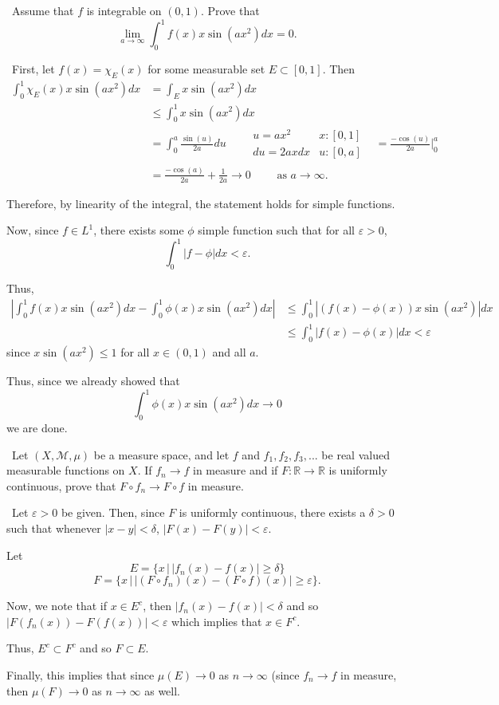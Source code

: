 \documentclass[12pt]{Homework}
\begin{document}
\begin{problem} $\,$
Assume that $f$ is integrable on $(0,1)$. Prove that $$\lim_{a\to\infty}\int_0^1f(x)x\sin(ax^2)dx=0.$$
\end{problem}


\begin{solution}$\,$
First, let $f(x)=\chi_E(x)$ for some measurable set $E\subset[0,1]$. Then \begin{align*}
    \int_0^1\chi_E(x)x\sin(ax^2)dx&=\int_Ex\sin(ax^2)dx\\
    &\le\int_0^1x\sin(ax^2)dx\\
    &=\int_0^a\frac{\sin(u)}{2a}du\qquad \begin{matrix}
    u=ax^2 &  x:[0,1]\\
    du=2axdx & u:[0,a]
\end{matrix}
&=\frac{-\cos(u)}{2a}\bigg|_0^a\\
&=\frac{-\cos(a)}{2a}+\frac{1}{2a}\to0\qquad\text{ as }a\to\infty.
\end{align*}

Therefore, by linearity of the integral, the statement holds for simple functions.

Now, since $f\in L^1$, there exists some $\phi$ simple function such that for all $\varepsilon>0$, $$\int_0^1|f-\phi|dx<\varepsilon.$$

Thus, \begin{align*}
    \left|\int_0^1f(x)x\sin(ax^2)dx-\int_0^1\phi(x)x\sin(ax^2)dx\right|&\le\int_0^1|(f(x)-\phi(x))x\sin(ax^2)|dx\\
    &\le\int_0^1|f(x)-\phi(x)|dx<\varepsilon
\end{align*} since $x\sin(ax^2)\le1$ for all $x\in(0,1)$ and all $a$.

Thus, since we already showed that $$\int_0^1\phi(x)x\sin(ax^2)dx\to0$$ we are done.
\end{solution}
\newpage

\begin{problem} $\,$
Let $(X,\mathscr{M},\mu)$ be a measure space, and let $f$ and $f_1,f_2,f_3,...$ be real valued measurable functions on $X$. If $f_n\to f$ in measure and if $F:\mathbb{R}\to\mathbb{R}$ is uniformly continuous, prove that $F\circ f_n\to F\circ f$ in measure.
\end{problem}


\begin{solution}$\,$
Let $\varepsilon>0$ be given. Then, since $F$ is uniformly continuous, there exists a $\delta>0$ such that whenever $|x-y|<\delta$, $|F(x)-F(y)|<\varepsilon.$

Let $$E=\{x\,|\,|f_n(x)-f(x)|\ge\delta\}$$
$$F=\{x\,|\,|(F\circ f_n)(x)-(F\circ f)(x)|\ge\varepsilon\}.$$

Now, we note that if $x\in E^c$, then $|f_n(x)-f(x)|<\delta$ and so $|F(f_n(x))-F(f(x))|<\varepsilon$ which implies that $x\in F^c$.

Thus, $E^c\subset F^c$ and so $F\subset E$.

Finally, this implies that since $\mu(E)\to0$ as $n\to\infty$ (since $f_n\to f$ in measure, then $\mu(F)\to0$ as $n\to\infty$ as well.
\end{solution}
\newpage
\end{document}
